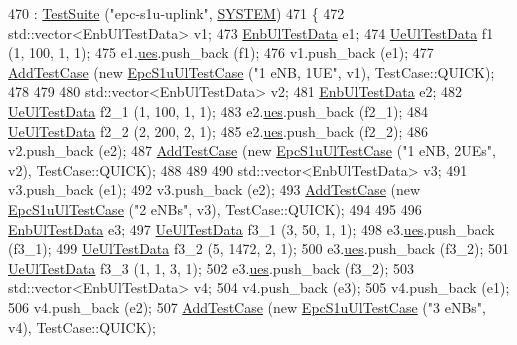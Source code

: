 \begin{DoxyCode}
470   : \hyperlink{classns3_1_1TestSuite_a904b0c40583b744d30908aeb94636d1a}{TestSuite} (\textcolor{stringliteral}{"epc-s1u-uplink"}, \hyperlink{classns3_1_1TestSuite_a1ebfcab34ec8161e085e8e3a1855eae0a90c5529a26ab3a5ffcc6e57040dbd82e}{SYSTEM})
471 \{  
472   std::vector<EnbUlTestData> v1;  
473   \hyperlink{structEnbUlTestData}{EnbUlTestData} e1;
474   \hyperlink{structUeUlTestData}{UeUlTestData} f1 (1, 100, 1, 1);
475   e1.\hyperlink{structEnbUlTestData_a66bd6b7f7c3c77824fcb76fa72aa5237}{ues}.push\_back (f1);
476   v1.push\_back (e1);
477   \hyperlink{classns3_1_1TestCase_a3718088e3eefd5d6454569d2e0ddd835}{AddTestCase} (\textcolor{keyword}{new} \hyperlink{classEpcS1uUlTestCase}{EpcS1uUlTestCase} (\textcolor{stringliteral}{"1 eNB, 1UE"}, v1), TestCase::QUICK);
478 
479 
480   std::vector<EnbUlTestData> v2;  
481   \hyperlink{structEnbUlTestData}{EnbUlTestData} e2;
482   \hyperlink{structUeUlTestData}{UeUlTestData} f2\_1 (1, 100, 1, 1);
483   e2.\hyperlink{structEnbUlTestData_a66bd6b7f7c3c77824fcb76fa72aa5237}{ues}.push\_back (f2\_1);
484   \hyperlink{structUeUlTestData}{UeUlTestData} f2\_2 (2, 200, 2, 1);
485   e2.\hyperlink{structEnbUlTestData_a66bd6b7f7c3c77824fcb76fa72aa5237}{ues}.push\_back (f2\_2);
486   v2.push\_back (e2);
487   \hyperlink{classns3_1_1TestCase_a3718088e3eefd5d6454569d2e0ddd835}{AddTestCase} (\textcolor{keyword}{new} \hyperlink{classEpcS1uUlTestCase}{EpcS1uUlTestCase} (\textcolor{stringliteral}{"1 eNB, 2UEs"}, v2), TestCase::QUICK);
488 
489 
490   std::vector<EnbUlTestData> v3;  
491   v3.push\_back (e1);
492   v3.push\_back (e2);
493   \hyperlink{classns3_1_1TestCase_a3718088e3eefd5d6454569d2e0ddd835}{AddTestCase} (\textcolor{keyword}{new} \hyperlink{classEpcS1uUlTestCase}{EpcS1uUlTestCase} (\textcolor{stringliteral}{"2 eNBs"}, v3), TestCase::QUICK);
494 
495 
496   \hyperlink{structEnbUlTestData}{EnbUlTestData} e3;
497   \hyperlink{structUeUlTestData}{UeUlTestData} f3\_1 (3, 50, 1, 1);
498   e3.\hyperlink{structEnbUlTestData_a66bd6b7f7c3c77824fcb76fa72aa5237}{ues}.push\_back (f3\_1);
499   \hyperlink{structUeUlTestData}{UeUlTestData} f3\_2 (5, 1472, 2, 1);
500   e3.\hyperlink{structEnbUlTestData_a66bd6b7f7c3c77824fcb76fa72aa5237}{ues}.push\_back (f3\_2);
501   \hyperlink{structUeUlTestData}{UeUlTestData} f3\_3 (1, 1, 3, 1);
502   e3.\hyperlink{structEnbUlTestData_a66bd6b7f7c3c77824fcb76fa72aa5237}{ues}.push\_back (f3\_2);
503   std::vector<EnbUlTestData> v4;  
504   v4.push\_back (e3);
505   v4.push\_back (e1);
506   v4.push\_back (e2);
507   \hyperlink{classns3_1_1TestCase_a3718088e3eefd5d6454569d2e0ddd835}{AddTestCase} (\textcolor{keyword}{new} \hyperlink{classEpcS1uUlTestCase}{EpcS1uUlTestCase} (\textcolor{stringliteral}{"3 eNBs"}, v4), TestCase::QUICK);

\end{DoxyCode}
